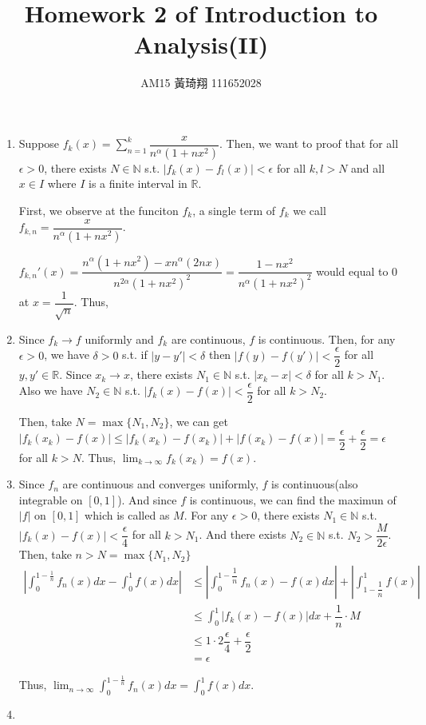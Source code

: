 \documentclass[12pt]{article}
\title{Homework 2 of Introduction to Analysis(II)}
\author{AM15 黃琦翔 111652028}
\begin{document}
\maketitle
\begin{enumerate}
    \item Suppose $f_k(x) = \displaystyle\sum_{n=1}^{k} \dfrac{x}{n^\alpha (1+nx^2)}$.
    Then, we want to proof that 
    for all $\epsilon > 0$, there exists $N \in \mathbb{N}$ s.t. 
    $|f_k(x) - f_l(x)| < \epsilon$ for all $k, l > N$ and all $x \in I$ where $I$ is a finite interval in $\mathbb{R}$.

    First, we observe at the funciton $f_k$, a single term of $f_k$ we call $f_{k, n} = \dfrac{x}{n^{\alpha}(1+nx^2)}$.

    $f_{k, n}'(x) = \dfrac{n^{\alpha}(1+nx^2) - xn^{\alpha}(2nx)}{n^{2\alpha}(1+nx^2)^2} = \dfrac{1-nx^2}{n^{\alpha}(1+nx^2)^2}$ would equal to $0$ at $x = \dfrac{1}{\sqrt{n}}$.
    Thus, 

    \item Since $f_k \to f$ uniformly and $f_k$ are continuous, $f$ is continuous.
    Then, for any $\epsilon > 0$, we have $\delta > 0 $ s.t. if $|y - y'| < \delta$ then $|f(y) - f(y')| < \dfrac{\epsilon}{2}$ for all $y, y' \in \mathbb{R}$.
    Since $x_k \to x$, there exists $N_1 \in \mathbb{N}$ s.t. $|x_k - x| < \delta$ for all $k > N_1$.
    Also we have $N_2 \in \mathbb{N}$ s.t. $|f_k(x) - f(x)| < \dfrac{\epsilon}{2}$ for all $k > N_2$.

    Then, take $N  = \max\{ N_1, N_2\}$, we can get $|f_k(x_k) - f(x)| \leq |f_k(x_k) - f(x_k)| + |f(x_k) - f(x)| = \dfrac{\epsilon}{2} + \dfrac{\epsilon}{2} = \epsilon$ for all $k > N$.
    Thus, $\displaystyle\lim_{k\to\infty} f_k(x_k) = f(x)$.

    \item Since $f_n$ are continuous and converges uniformly, $f$ is continuous(also integrable on $[0, 1]$).
    And since $f$ is continuous, we can find the maximun of $|f|$ on $[0, 1]$ which is called as $M$.
    For any $\epsilon > 0$, there exists $N_1 \in \mathbb{N}$ s.t. $|f_k(x) - f(x)| < \dfrac{\epsilon}{4}$ for all $k > N_1$.
    And there exists $N_2 \in \mathbb{N}$ s.t. $N_2 > \dfrac{M}{2\epsilon}$.
    Then, take $n > N = \max\{N_1, N_2\}$ \begin{align*}
        \left|\int_0^{1-\frac{1}{n}} f_n(x) dx - \int_0^1 f(x) dx\right| &\leq \left|\int_{0}^{1-\dfrac{1}{n}} f_n(x) - f(x) dx\right| + \left|\int_{1-\dfrac{1}{n}}^{1} f(x)\right|\\
        &\leq \int_0^1 |f_k(x) - f(x)| dx + \dfrac{1}{n} \cdot M\\
        &\leq 1 \cdot 2\dfrac{\epsilon}{4} + \dfrac{\epsilon}{2}\\
        &= \epsilon
    \end{align*}

    Thus, $\displaystyle\lim_{n\to\infty} \displaystyle\int_{0}^{1-\frac{1}{n}} f_n(x) dx = \displaystyle\int_0^1 f(x) dx$.

    \item 
\end{enumerate}
\end{document}

